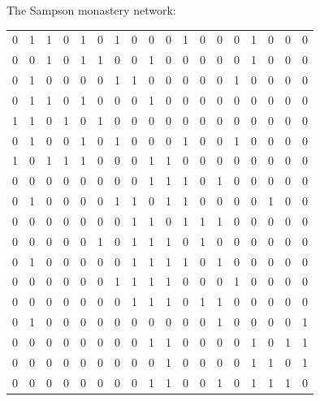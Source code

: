 \documentclass[ 10pt]{beamer}
\begin{document}
{The Sampson monastery network:
{\tiny
\begin{table}[ht]
\begin{center}
\begin{tabular}{rrrrrrrrrrrrrrrrrr}
  \hline
0 & 1 & 1 & 0 & 1 & 0 & 1 & 0 & 0 & 0 & 1 & 0 & 0 & 0 & 1 & 0 & 0 & 0 \\ 
0 & 0 & 1 & 0 & 1 & 1 & 0 & 0 & 1 & 0 & 0 & 0 & 0 & 0 & 1 & 0 & 0 & 0 \\ 
0 & 1 & 0 & 0 & 0 & 0 & 1 & 1 & 0 & 0 & 0 & 0 & 0 & 1 & 0 & 0 & 0 & 0 \\ 
0 & 1 & 1 & 0 & 1 & 0 & 0 & 0 & 1 & 0 & 0 & 0 & 0 & 0 & 0 & 0 & 0 & 0 \\ 
1 & 1 & 0 & 1 & 0 & 1 & 0 & 0 & 0 & 0 & 0 & 0 & 0 & 0 & 0 & 0 & 0 & 0 \\ 
0 & 1 & 0 & 0 & 1 & 0 & 1 & 0 & 0 & 0 & 1 & 0 & 0 & 1 & 0 & 0 & 0 & 0 \\ 
1 & 0 & 1 & 1 & 1 & 0 & 0 & 0 & 1 & 1 & 0 & 0 & 0 & 0 & 0 & 0 & 0 & 0 \\ 
0 & 0 & 0 & 0 & 0 & 0 & 0 & 0 & 1 & 1 & 1 & 0 & 1 & 0 & 0 & 0 & 0 & 0 \\ 
0 & 1 & 0 & 0 & 0 & 0 & 1 & 1 & 0 & 1 & 1 & 0 & 0 & 0 & 0 & 1 & 0 & 0 \\ 
0 & 0 & 0 & 0 & 0 & 0 & 0 & 1 & 1 & 0 & 1 & 1 & 1 & 0 & 0 & 0 & 0 & 0 \\ 
0 & 0 & 0 & 0 & 0 & 1 & 0 & 1 & 1 & 1 & 0 & 1 & 0 & 0 & 0 & 0 & 0 & 0 \\ 
0 & 1 & 0 & 0 & 0 & 0 & 0 & 1 & 1 & 1 & 1 & 0 & 1 & 0 & 0 & 0 & 0 & 0 \\ 
0 & 0 & 0 & 0 & 0 & 0 & 1 & 1 & 1 & 1 & 0 & 0 & 0 & 1 & 0 & 0 & 0 & 0 \\ 
0 & 0 & 0 & 0 & 0 & 0 & 0 & 1 & 1 & 1 & 0 & 1 & 1 & 0 & 0 & 0 & 0 & 0 \\ 
0 & 1 & 0 & 0 & 0 & 0 & 0 & 0 & 0 & 0 & 0 & 0 & 1 & 0 & 0 & 0 & 0 & 1 \\ 
0 & 0 & 0 & 0 & 0 & 0 & 0 & 0 & 1 & 1 & 0 & 0 & 0 & 0 & 1 & 0 & 1 & 1 \\ 
0 & 0 & 0 & 0 & 0 & 0 & 0 & 0 & 0 & 1 & 0 & 0 & 0 & 0 & 1 & 1 & 0 & 1 \\ 
0 & 0 & 0 & 0 & 0 & 0 & 0 & 0 & 1 & 1 & 0 & 0 & 1 & 0 & 1 & 1 & 1 & 0 \\ 
   \hline
\end{tabular}
\end{center}
\end{table}}
}
%
\end{document}

